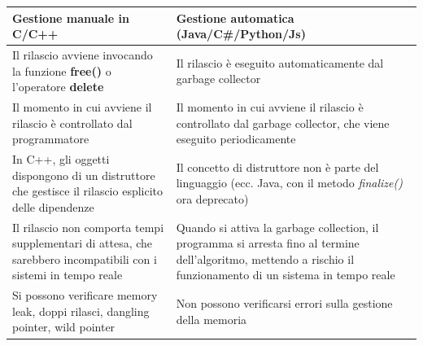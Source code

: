 \begin{table}[H]
  \renewcommand{\arraystretch}{1.5}
  \centering
  \begin{tabularx}{\textwidth}{X X}
    \hline
    \textbf{Gestione manuale in C/C++}                                                                               & \textbf{Gestione automatica (Java/C\#/Python/Js)}                                                                                                                \\
    \hline
    Il rilascio avviene invocando la funzione \textbf{free()} o l'operatore \textbf{delete}                          & Il rilascio è eseguito automaticamente dal garbage collector                                                                                                     \\

    Il momento in cui avviene il rilascio è controllato dal programmatore                                            & Il momento in cui avviene il rilascio è controllato dal garbage collector, che viene eseguito periodicamente                                                     \\

    In C++, gli oggetti dispongono di un distruttore che gestisce il rilascio esplicito delle dipendenze             & Il concetto di distruttore non è parte del linguaggio (ecc. Java, con il metodo \textit{finalize()} ora deprecato)                                               \\

    Il rilascio non comporta tempi supplementari di attesa, che sarebbero incompatibili con i sistemi in tempo reale & Quando si attiva la garbage collection, il programma si arresta fino al termine dell'algoritmo, mettendo a rischio il funzionamento di un sistema in tempo reale \\

    Si possono verificare memory leak, doppi rilasci, dangling pointer, wild pointer                                 & Non possono verificarsi errori sulla gestione della memoria                                                                                                      \\
    \hline
  \end{tabularx}
\end{table}

